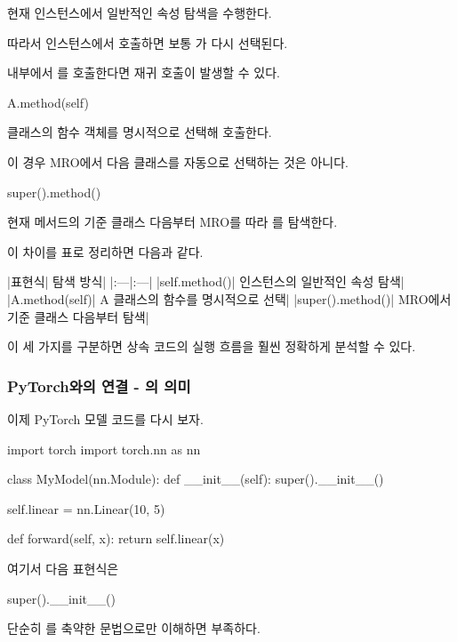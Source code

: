 현재 인스턴스에서 일반적인 속성 탐색을 수행한다.

따라서  인스턴스에서 호출하면 보통 가 다시 선택된다.

 내부에서 를 호출한다면 재귀 호출이 발생할 수 있다.

\begin{dhkcode}
A.method(self)
\end{dhkcode}

 클래스의  함수 객체를 명시적으로 선택해 호출한다.

이 경우 MRO에서 다음 클래스를 자동으로 선택하는 것은 아니다.

\begin{dhkcode}
super().method()
\end{dhkcode}

현재 메서드의 기준 클래스 다음부터 MRO를 따라 를 탐색한다.

이 차이를 표로 정리하면 다음과 같다.

\begin{dhktable}
|표현식|	탐색 방식|
|:---|:---|
|self.method()|	인스턴스의 일반적인 속성 탐색|
|A.method(self)|	A 클래스의 함수를 명시적으로 선택|
|super().method()|	MRO에서 기준 클래스 다음부터 탐색|
\end{dhktable}

이 세 가지를 구분하면 상속 코드의 실행 흐름을 훨씬 정확하게 분석할 수 있다.

\subsubsection{PyTorch와의 연결 - 의 의미}

이제 PyTorch 모델 코드를 다시 보자.

\begin{dhkcode}
import torch
import torch.nn as nn


class MyModel(nn.Module):
    def __init__(self):
        super().__init__()

        self.linear = nn.Linear(10, 5)

    def forward(self, x):
        return self.linear(x)
\end{dhkcode}

여기서 다음 표현식은

\begin{dhkcode}
super().__init__()
\end{dhkcode}

단순히 를 축약한 문법으로만 이해하면 부족하다.

